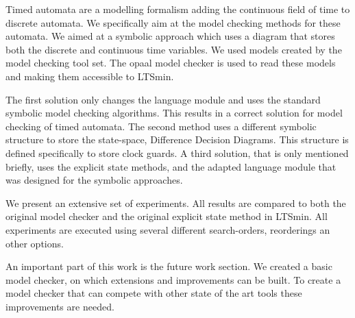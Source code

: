 Timed automata are a modelling formalism adding the continuous field of time to discrete automata. We specifically aim at the model checking methods for these automata. We aimed at a symbolic approach which uses a diagram that stores both the discrete and continuous time variables. We used models created by the \uppaal{} model checking tool set. The opaal model checker is used to read these models and making them accessible to LTSmin. 

The first solution only changes the language module and uses the standard symbolic model checking algorithms. This results in a correct solution for model checking of timed automata. The second method uses a different symbolic structure to store the state-space, Difference Decision Diagrams. This structure is defined specifically to store clock guards. A third solution, that is only mentioned briefly, uses the explicit state methods, and the adapted language module that was designed for the symbolic approaches.

We present an extensive set of experiments. All results are compared to both the original \uppaal{} model checker and the original explicit state method in LTSmin. All experiments are executed using several different search-orders, reorderings an other options.

An important part of this work is the future work section. We created a basic model checker, on which extensions and improvements can be built. To create a model checker that can compete with other state of the art tools these improvements are needed. 